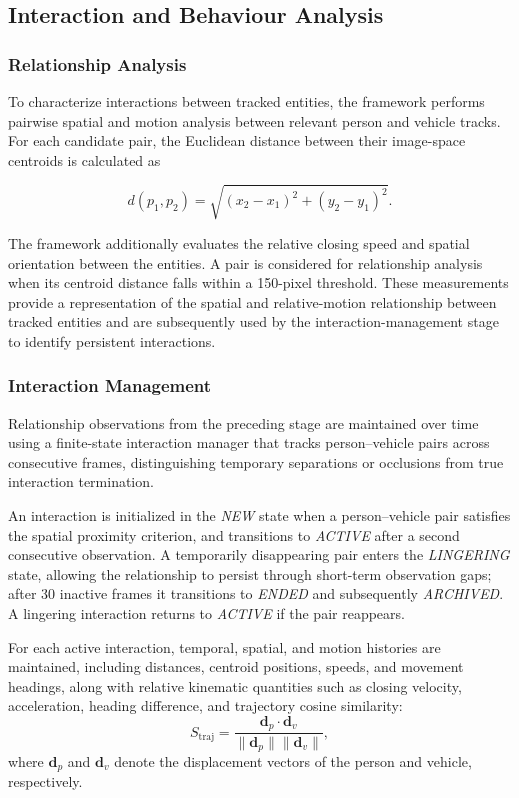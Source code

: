 \documentclass[runningheads]{llncs}
\begin{document}
\subsection{Interaction and Behaviour Analysis}

\subsubsection{Relationship Analysis}

To characterize interactions between tracked entities, the framework
performs pairwise spatial and motion analysis between relevant person and
vehicle tracks. For each candidate pair, the Euclidean distance between
their image-space centroids is calculated as

\begin{equation}
d(p_1,p_2)=
\sqrt{(x_2-x_1)^2+(y_2-y_1)^2}.
\end{equation}

The framework additionally evaluates the relative closing speed and
spatial orientation between the entities. A pair is considered for
relationship analysis when its centroid distance falls within a
150-pixel threshold. These measurements provide a representation of the
spatial and relative-motion relationship between tracked entities and
are subsequently used by the interaction-management stage to identify
persistent interactions.

\subsubsection{Interaction Management}
Relationship observations from the preceding stage are maintained over
time using a finite-state interaction manager that tracks person--vehicle
pairs across consecutive frames, distinguishing temporary separations or
occlusions from true interaction termination.

An interaction is initialized in the \textit{NEW} state when a
person--vehicle pair satisfies the spatial proximity criterion, and
transitions to \textit{ACTIVE} after a second consecutive observation. A
temporarily disappearing pair enters the \textit{LINGERING} state,
allowing the relationship to persist through short-term observation gaps;
after 30 inactive frames it transitions to \textit{ENDED} and subsequently
\textit{ARCHIVED}. A lingering interaction returns to \textit{ACTIVE} if
the pair reappears.

For each active interaction, temporal, spatial, and motion histories are
maintained, including distances, centroid positions, speeds, and movement
headings, along with relative kinematic quantities such as closing
velocity, acceleration, heading difference, and trajectory cosine
similarity:
\begin{equation}
S_{\mathrm{traj}} =
\frac{\mathbf{d}_{p}\cdot\mathbf{d}_{v}}
{\|\mathbf{d}_{p}\|\|\mathbf{d}_{v}\|},
\end{equation}
where $\mathbf{d}_{p}$ and $\mathbf{d}_{v}$ denote the displacement
vectors of the person and vehicle, respectively.
\end{document}
